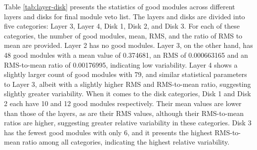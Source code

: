 
Table \ref{tab:layer-disk} presents the statistics of good modules across different layers and disks for final module veto list. The layers and disks are divided into five categories: Layer 3, Layer 4, Disk 1, Disk 2, and Disk 3. For each of these categories, the number of good modules, mean, RMS, and the ratio of RMS to mean are provided. Layer 2 has no good modules. %
Layer 3, on the other hand, has 48 good modules with a mean value of 0.374681, an RMS of 0.000663165 and an RMS-to-mean ratio of 0.00176995, indicating low variability. Layer 4 shows a slightly larger count of good modules with 79, and similar statistical parameters to Layer 3, albeit with a slightly higher RMS and RMS-to-mean ratio, suggesting slightly greater variability. When it comes to the disk categories, Disk 1 and Disk 2 each have 10 and 12 good modules respectively. Their mean values are lower than those of the layers, as are their RMS values, although their RMS-to-mean ratios are higher, suggesting greater relative variability in these categories. Disk 3 has the fewest good modules with only 6, and it presents the highest RMS-to-mean ratio among all categories, indicating the highest relative variability. %

